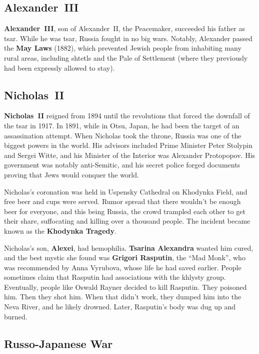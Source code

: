 \subsection*{Alexander~III}

\textbf{Alexander~III}, son of Alexander~II, the Peacemaker, succeeded his father as tsar.
While he was tsar, Russia fought in no big wars.
Notably, Alexander passed the \textbf{May Laws} (1882), which prevented Jewish people from inhabiting many rural areas,
including shtetls and the Pale of Settlement (where they previously had been expressly allowed to stay).

\subsection*{Nicholas~II}

\textbf{Nicholas~II} reigned from 1894 until the revolutions that forced the downfall of the tsar in 1917.
In 1891, while in Otsu, Japan, he had been the target of an assassination attempt.
When Nicholas took the throne, Russia was one of the biggest powers in the world.
His advisors included Prime Minister Peter Stolypin and Sergei Witte,
and his Minister of the Interior was Alexander Protopopov.
His government was notably anti-Semitic,
and his secret police forged documents proving that Jews would conquer the world.

Nicholas's coronation was held in Uspensky Cathedral on Khodynka Field, and free beer and cups were served.
Rumor spread that there wouldn't be enough beer for everyone, and this being Russia,
the crowd trampled each other to get their share, suffocating and killing over a thousand people.
The incident became known as the \textbf{Khodynka Tragedy}.

Nicholas's son, \textbf{Alexei}, had hemophilia.
\textbf{Tsarina Alexandra} wanted him cured, and the best mystic she found was \textbf{Grigori Rasputin}, the ``Mad Monk'',
who was recommended by Anna Vyrubova, whose life he had saved earlier.
People sometimes claim that Rasputin had associations with the khlysty group.
Eventually, people like Oswald Rayner decided to kill Rasputin.
They poisoned him.
Then they shot him.
When that didn't work, they dumped him into the Neva River, and he likely drowned.
Later, Rasputin's body was dug up and burned.

\subsection*{Russo-Japanese War}

